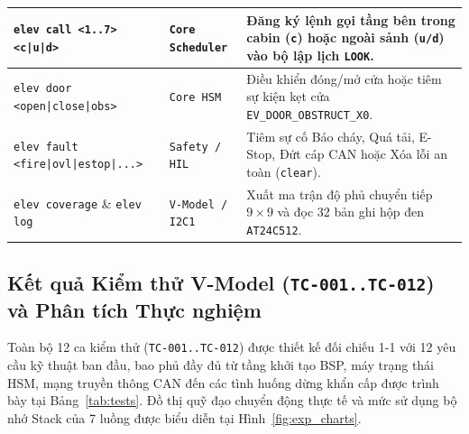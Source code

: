 \begin{xltabular}{\textwidth}{|L{4.1cm}|L{2.5cm}|Y|}
\hline
{}
\texttt{elev call <1..7> <c|u|d>} & \texttt{Core Scheduler} & Đăng ký lệnh gọi tầng bên trong cabin (\texttt{c}) hoặc ngoài sảnh (\texttt{u/d}) vào bộ lập lịch \texttt{LOOK}. \\
\hline
\texttt{elev door <open|close|obs>} & \texttt{Core HSM} & Điều khiển đóng/mở cửa hoặc tiêm sự kiện kẹt cửa \texttt{EV\_DOOR\_OBSTRUCT\_X0}. \\
\hline
{}
\texttt{elev fault <fire|ovl|estop|...>} & \texttt{Safety / HIL} & Tiêm sự cố Báo cháy, Quá tải, E-Stop, Đứt cáp CAN hoặc Xóa lỗi an toàn (\texttt{clear}). \\
\hline
\texttt{elev coverage} \& \texttt{elev log} & \texttt{V-Model / I2C1} & Xuất ma trận độ phủ chuyển tiếp $9\times 9$ và đọc 32 bản ghi hộp đen \texttt{AT24C512}. \\
\end{xltabular}
\endgroup

\subsection{Kết quả Kiểm thử V-Model (\texttt{TC-001..TC-012}) và Phân tích Thực nghiệm}
Toàn bộ 12 ca kiểm thử (\texttt{TC-001..TC-012}) được thiết kế đối chiếu 1-1 với 12 yêu cầu kỹ thuật ban đầu, bao phủ đầy đủ từ tầng khởi tạo BSP, máy trạng thái HSM, mạng truyền thông CAN đến các tình huống dừng khẩn cấp được trình bày tại Bảng~\ref{tab:tests}. Đồ thị quỹ đạo chuyển động thực tế và mức sử dụng bộ nhớ Stack của 7 luồng được biểu diễn tại Hình~\ref{fig:exp_charts}.


